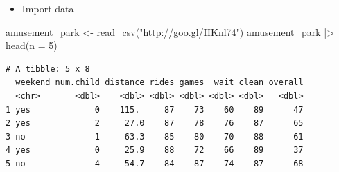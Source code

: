 \documentclass[
  ignorenonframetext,
]{beamer}
\newenvironment{Shaded}{\begin{snugshade}}{\end{snugshade}}
\newcommand{\AttributeTok}[1]{\textcolor[rgb]{0.40,0.45,0.13}{#1}}
\newcommand{\DecValTok}[1]{\textcolor[rgb]{0.68,0.00,0.00}{#1}}
\newcommand{\FunctionTok}[1]{\textcolor[rgb]{0.28,0.35,0.67}{#1}}
\newcommand{\NormalTok}[1]{\textcolor[rgb]{0.00,0.23,0.31}{#1}}
\newcommand{\OtherTok}[1]{\textcolor[rgb]{0.00,0.23,0.31}{#1}}
\newcommand{\SpecialCharTok}[1]{\textcolor[rgb]{0.37,0.37,0.37}{#1}}
\newcommand{\StringTok}[1]{\textcolor[rgb]{0.13,0.47,0.30}{#1}}
\providecommand{\tightlist}{%
  \setlength{\itemsep}{0pt}\setlength{\parskip}{0pt}}\usepackage{longtable,booktabs,array}
\begin{document}
\begin{frame}[fragile]{}
\label{section-3}
\begin{itemize}
\tightlist
\item
  Import data
\end{itemize}

\tiny

\begin{Shaded}
\begin{Highlighting}[]
\NormalTok{amusement\_park }\OtherTok{\textless{}{-}} \FunctionTok{read\_csv}\NormalTok{(}\StringTok{"http://goo.gl/HKnl74"}\NormalTok{)}
\NormalTok{amusement\_park }\SpecialCharTok{|\textgreater{}} \FunctionTok{head}\NormalTok{(}\AttributeTok{n =} \DecValTok{5}\NormalTok{)}
\end{Highlighting}
\end{Shaded}

\begin{verbatim}
# A tibble: 5 x 8
  weekend num.child distance rides games  wait clean overall
  <chr>       <dbl>    <dbl> <dbl> <dbl> <dbl> <dbl>   <dbl>
1 yes             0    115.     87    73    60    89      47
2 yes             2     27.0    87    78    76    87      65
3 no              1     63.3    85    80    70    88      61
4 yes             0     25.9    88    72    66    89      37
5 no              4     54.7    84    87    74    87      68
\end{verbatim}
\end{frame}
\end{document}

